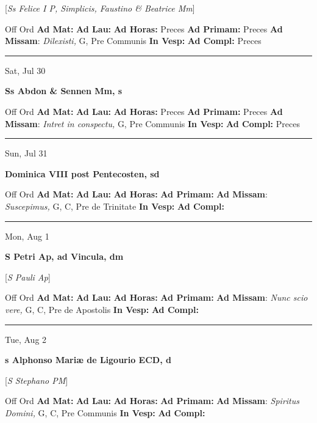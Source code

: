 \documentclass[letterpaper, 10pt]{article}
\begin{document}
[\textit{Ss Felice I P, Simplicis, Faustino \& Beatrice Mm}]
\begin{justify}
Off Ord
\textbf{Ad Mat: }
\textbf{Ad Lau: }
\textbf{Ad Horas: }Preces
\textbf{Ad Primam: }Preces
\textbf{Ad Missam}: \textit{Dilexisti,} G, Pre Communis
\textbf{In Vesp: }
\textbf{Ad Compl: }Preces\end{justify}



\hrule
\begin{center}
Sat, Jul 30
\end{center}\textbf{ \large Ss Abdon \& Sennen Mm, \textnormal{\normalsize s}}
\begin{justify}
Off Ord
\textbf{Ad Mat: }
\textbf{Ad Lau: }
\textbf{Ad Horas: }Preces
\textbf{Ad Primam: }Preces
\textbf{Ad Missam}: \textit{Intret in conspectu,} G, Pre Communis
\textbf{In Vesp: }
\textbf{Ad Compl: }Preces\end{justify}



\hrule
\begin{center}
Sun, Jul 31
\end{center}\textbf{ \large Dominica VIII post Pentecosten, \textnormal{\normalsize sd}}
\begin{justify}
Off Ord
\textbf{Ad Mat: }
\textbf{Ad Lau: }
\textbf{Ad Horas: }
\textbf{Ad Primam: }
\textbf{Ad Missam}: \textit{Suscepimus,} G, C, Pre de Trinitate
\textbf{In Vesp: }
\textbf{Ad Compl: }\end{justify}



\hrule
\begin{center}
Mon, Aug 1
\end{center}\textbf{ \large S Petri Ap, ad Vincula, \textnormal{\normalsize dm}}

[\textit{S Pauli Ap}]
\begin{justify}
Off Ord
\textbf{Ad Mat: }
\textbf{Ad Lau: }
\textbf{Ad Horas: }
\textbf{Ad Primam: }
\textbf{Ad Missam}: \textit{Nunc scio vere,} G, C, Pre de Apostolis
\textbf{In Vesp: }
\textbf{Ad Compl: }\end{justify}



\hrule
\begin{center}
Tue, Aug 2
\end{center}\textbf{ \large s Alphonso Mariæ de Ligourio ECD, \textnormal{\normalsize d}}

[\textit{S Stephano PM}]
\begin{justify}
Off Ord
\textbf{Ad Mat: }
\textbf{Ad Lau: }
\textbf{Ad Horas: }
\textbf{Ad Primam: }
\textbf{Ad Missam}: \textit{Spiritus Domini,} G, C, Pre Communis
\textbf{In Vesp: }
\textbf{Ad Compl: }\end{justify}
\end{document}
